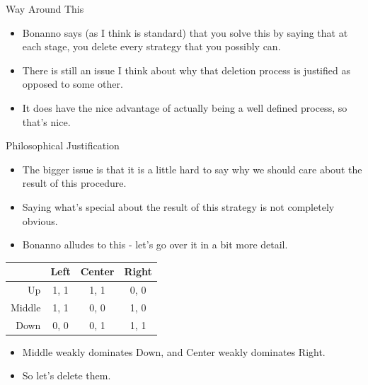 \documentclass[
  14pt,
  letterpaper,
  ignorenonframetext,
  aspectratio=169,
]{beamer}
\providecommand{\tightlist}{%
  \setlength{\itemsep}{0pt}\setlength{\parskip}{0pt}}\usepackage{longtable,booktabs,array}
\let\olditem\item
\renewcommand{\item}{%
\olditem\vspace{6pt}}
\begin{document}
\begin{frame}{Way Around This}
\protect\hypertarget{way-around-this}{}
\begin{itemize}[<+->]
\tightlist
\item
  Bonanno says (as I think is standard) that you solve this by saying
  that at each stage, you delete every strategy that you possibly can.
\item
  There is still an issue I think about why that deletion process is
  justified as opposed to some other.
\item
  It does have the nice advantage of actually being a well defined
  process, so that's nice.
\end{itemize}
\end{frame}

\begin{frame}{Philosophical Justification}
\protect\hypertarget{philosophical-justification}{}
\begin{itemize}[<+->]
\tightlist
\item
  The bigger issue is that it is a little hard to say why we should care
  about the result of this procedure.
\item
  Saying what's special about the result of this strategy is not
  completely obvious.
\item
  Bonanno alludes to this - let's go over it in a bit more detail.
\end{itemize}
\end{frame}

\begin{frame}
\begin{table}[!h]
\centering
\begin{tabular}[t]{>{}r|ccc}
\toprule
 & Left & Center & Right\\
\midrule
Up & 1, 1 & 1, 1 & 0, 0\\
Middle & 1, 1 & 0, 0 & 1, 0\\
Down & 0, 0 & 0, 1 & 1, 1\\
\bottomrule
\end{tabular}
\end{table}

\begin{itemize}[<+->]
\tightlist
\item
  Middle weakly dominates Down, and Center weakly dominates Right.
\item
  So let's delete them.
\end{itemize}
\end{frame}
\end{document}
